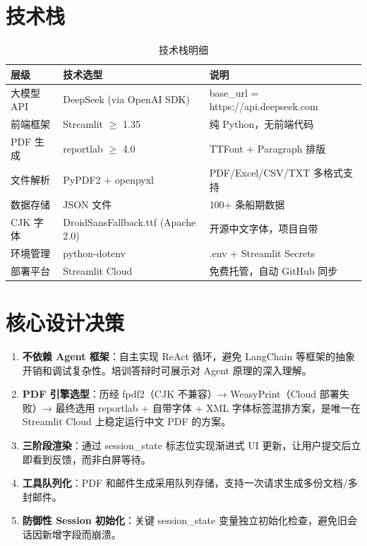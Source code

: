 \documentclass[12pt,a4paper]{ctexart}
\begin{document}
\section{技术栈}

\begin{table}[h]
\centering
\begin{tabular}{|l|l|l|}
\hline
\textbf{层级}   & \textbf{技术选型}                 & \textbf{说明}                       \\ \hline
大模型 API      & DeepSeek (via OpenAI SDK)        & base\_url = https://api.deepseek.com \\ \hline
前端框架        & Streamlit $\ge$ 1.35             & 纯 Python，无前端代码                  \\ \hline
PDF 生成        & reportlab $\ge$ 4.0              & TTFont + Paragraph 排版              \\ \hline
文件解析        & PyPDF2 + openpyxl                & PDF/Excel/CSV/TXT 多格式支持          \\ \hline
数据存储        & JSON 文件                         & 100+ 条船期数据                      \\ \hline
CJK 字体        & DroidSansFallback.ttf (Apache 2.0) & 开源中文字体，项目自带                \\ \hline
环境管理        & python-dotenv                     & .env + Streamlit Secrets             \\ \hline
部署平台        & Streamlit Cloud                   & 免费托管，自动 GitHub 同步             \\ \hline
\end{tabular}
\caption{技术栈明细}
\end{table}

\section{核心设计决策}

\begin{enumerate}[leftmargin=*]
    \item \textbf{不依赖 Agent 框架}：自主实现 ReAct 循环，避免 LangChain 等框架的抽象开销和调试复杂性。培训答辩时可展示对 Agent 原理的深入理解。
    \item \textbf{PDF 引擎选型}：历经 fpdf2（CJK 不兼容）→ WeasyPrint（Cloud 部署失败）→ 最终选用 reportlab + 自带字体 + XML 字体标签混排方案，是唯一在 Streamlit Cloud 上稳定运行中文 PDF 的方案。
    \item \textbf{三阶段渲染}：通过 session\_state 标志位实现渐进式 UI 更新，让用户提交后立即看到反馈，而非白屏等待。
    \item \textbf{工具队列化}：PDF 和邮件生成采用队列存储，支持一次请求生成多份文档/多封邮件。
    \item \textbf{防御性 Session 初始化}：关键 session\_state 变量独立初始化检查，避免旧会话因新增字段而崩溃。
\end{enumerate}
\end{document}
